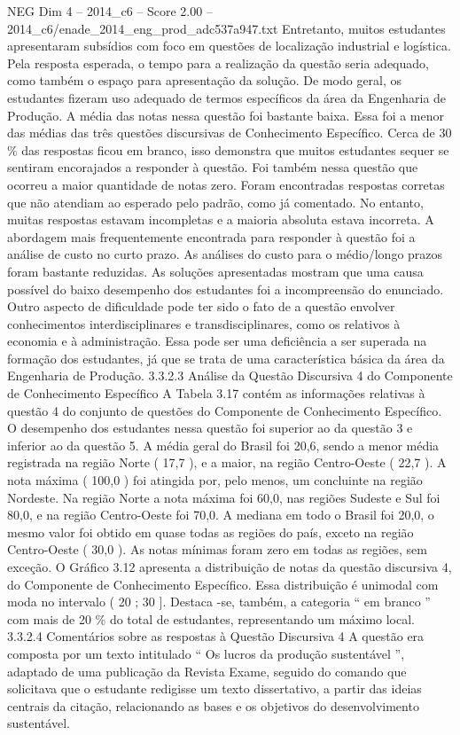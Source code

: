 \begin{textsample}{NEG Dim 4 – 2014\_c6 – Score 2.00 – 2014\_c6/enade\_2014\_eng\_prod\_adc537a947.txt}
Entretanto, muitos estudantes apresentaram subsídios com foco em questões de localização industrial e logística.
Pela resposta esperada, o tempo para a realização da questão seria adequado, como também o espaço para apresentação da solução.
De modo geral, os estudantes fizeram uso adequado de termos específicos da área da Engenharia de Produção.
A média das notas nessa questão foi bastante baixa.
Essa foi a menor das médias das três questões discursivas de Conhecimento Específico.
Cerca de 30 \% das respostas ficou em branco, isso demonstra que muitos estudantes sequer se sentiram encorajados a responder à questão.
Foi também nessa questão que ocorreu a maior quantidade de notas zero.
Foram encontradas respostas corretas que não atendiam ao esperado pelo padrão, como já comentado.
No entanto, muitas respostas estavam incompletas e a maioria absoluta estava incorreta.
A abordagem mais frequentemente encontrada para responder à questão foi a análise de custo no curto prazo.
As análises do custo para o médio/longo prazos foram bastante reduzidas.
As soluções apresentadas mostram que uma causa possível do baixo desempenho dos estudantes foi a incompreensão do enunciado.
Outro aspecto de dificuldade pode ter sido o fato de a questão envolver conhecimentos interdisciplinares e transdisciplinares, como os relativos à economia e à administração.
Essa pode ser uma deficiência a ser superada na formação dos estudantes, já que se trata de uma característica básica da área da Engenharia de Produção. 3.3.2.3 Análise da Questão Discursiva 4 do Componente de Conhecimento Específico A Tabela 3.17 contém as informações relativas à questão 4 do conjunto de questões do Componente de Conhecimento Específico.
O desempenho dos estudantes nessa questão foi superior ao da questão 3 e inferior ao da questão 5.
A média geral do Brasil foi 20,6, sendo a menor média registrada na região Norte ( 17,7 ), e a maior, na região Centro-Oeste ( 22,7 ).
A nota máxima ( 100,0 ) foi atingida por, pelo menos, um concluinte na região Nordeste.
Na região Norte a nota máxima foi 60,0, nas regiões Sudeste e Sul foi 80,0, e na região Centro-Oeste foi 70,0.
A mediana em todo o Brasil foi 20,0, o mesmo valor foi obtido em quase todas as regiões do país, exceto na região Centro-Oeste ( 30,0 ).
As notas mínimas foram zero em todas as regiões, sem exceção.
O Gráfico 3.12 apresenta a distribuição de notas da questão discursiva 4, do Componente de Conhecimento Específico.
Essa distribuição é unimodal com moda no intervalo ( 20 ; 30 ].
Destaca -se, também, a categoria “ em branco ” com mais de 20 \% do total de estudantes, representando um máximo local. 3.3.2.4 Comentários sobre as respostas à Questão Discursiva 4 A questão era composta por um texto intitulado “ Os lucros da produção sustentável ”, adaptado de uma publicação da Revista Exame, seguido do comando que solicitava que o estudante redigisse um texto dissertativo, a partir das ideias centrais da citação, relacionando as bases e os objetivos do desenvolvimento sustentável.

\end{textsample}
